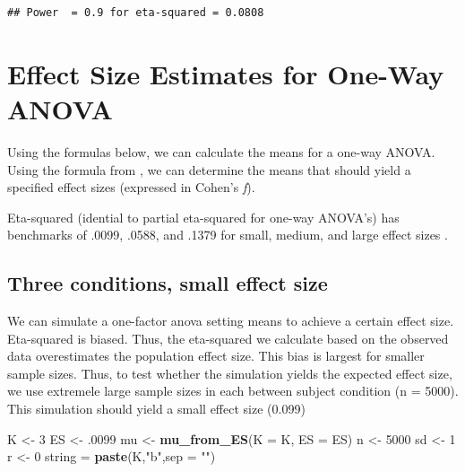 \documentclass[
]{book}
\newenvironment{Shaded}{\begin{snugshade}}{\end{snugshade}}
\newcommand{\CommentTok}[1]{\textcolor[rgb]{0.56,0.35,0.01}{\textit{#1}}}
\newcommand{\DataTypeTok}[1]{\textcolor[rgb]{0.13,0.29,0.53}{#1}}
\newcommand{\DecValTok}[1]{\textcolor[rgb]{0.00,0.00,0.81}{#1}}
\newcommand{\FloatTok}[1]{\textcolor[rgb]{0.00,0.00,0.81}{#1}}
\newcommand{\KeywordTok}[1]{\textcolor[rgb]{0.13,0.29,0.53}{\textbf{#1}}}
\newcommand{\NormalTok}[1]{#1}
\newcommand{\StringTok}[1]{\textcolor[rgb]{0.31,0.60,0.02}{#1}}
\begin{document}
\begin{verbatim}
## Power  = 0.9 for eta-squared = 0.0808
\end{verbatim}

\begin{Shaded}
\end{Shaded}

\newpage

\hypertarget{effect-size-estimates-for-one-way-anova}{%
\section{Effect Size Estimates for One-Way ANOVA}\label{effect-size-estimates-for-one-way-anova}}

Using the formulas below, we can calculate the means for a one-way ANOVA. Using the formula from \citet{albers2018power}, we can determine the means that should yield a specified effect sizes (expressed in Cohen's \emph{f}).

Eta-squared (idential to partial eta-squared for one-way ANOVA's) has benchmarks of .0099, .0588, and .1379 for small, medium, and large effect sizes \citep{cohen1988spa}.

\hypertarget{three-conditions-small-effect-size}{%
\subsection{Three conditions, small effect size}\label{three-conditions-small-effect-size}}

We can simulate a one-factor anova setting means to achieve a certain effect size. Eta-squared is biased. Thus, the eta-squared we calculate based on the observed data overestimates the population effect size. This bias is largest for smaller sample sizes. Thus, to test whether the simulation yields the expected effect size, we use extremele large sample sizes in each between subject condition (n = 5000). This simulation should yield a small effect size (0.099)

\begin{Shaded}
\begin{Highlighting}[]
\NormalTok{K <-}\StringTok{ }\DecValTok{3}
\NormalTok{ES <-}\StringTok{ }\FloatTok{.0099}
\NormalTok{mu <-}\StringTok{ }\KeywordTok{mu_from_ES}\NormalTok{(}\DataTypeTok{K =}\NormalTok{ K, }\DataTypeTok{ES =}\NormalTok{ ES)}
\NormalTok{n <-}\StringTok{ }\DecValTok{5000}
\NormalTok{sd <-}\StringTok{ }\DecValTok{1}
\NormalTok{r <-}\StringTok{ }\DecValTok{0}
\NormalTok{string =}\StringTok{ }\KeywordTok{paste}\NormalTok{(K,}\StringTok{"b"}\NormalTok{,}\DataTypeTok{sep =} \StringTok{""}\NormalTok{)}
\end{Highlighting}
\end{Shaded}
\end{document}

